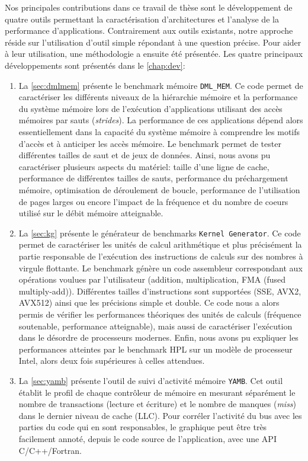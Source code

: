    
    Nos principales contributions dans ce travail de thèse sont le développement de quatre outils permettant la caractérisation d'architectures et l'analyse de la performance d'applications. Contrairement aux outils existants, notre approche réside sur l'utilisation d'outil simple répondant à une question précise. Pour aider à leur utilisation, une méthodologie a ensuite été présentée. Les quatre principaux développements sont présentés dans le \autoref{chap:dev}:
    \begin{enumerate}
        \item La \autoref{sec:dmlmem} présente le benchmark mémoire \verb|DML_MEM|. Ce code permet de caractériser les différents niveaux de la hiérarchie mémoire et la performance du système mémoire lors de l'exécution d'applications utilisant des accès mémoires par sauts (\textit{strides}). La performance de ces applications dépend alors essentiellement dans la capacité du système mémoire à comprendre les motifs d'accès et à anticiper les accès mémoire.
        Le benchmark permet de tester différentes tailles de saut et de jeux de données. Ainsi, nous avons pu caractériser plusieurs aspects du matériel: taille d'une ligne de cache, performance de différentes tailles de sauts, performance du préchargement mémoire, optimisation de déroulement de boucle, performance de l'utilisation de pages larges ou encore l'impact de la fréquence et du nombre de coeurs utilisé sur le débit mémoire atteignable.
        
        \item La \autoref{sec:kg} présente le générateur de benchmarks \verb|Kernel Generator|. Ce code permet de caractériser les unités de calcul arithmétique et plus précisément la partie responsable de l'exécution des instructions de calculs sur des nombres à virgule flottante. Le benchmark génère un code assembleur correspondant aux opérations voulues par l'utilisateur (addition, multiplication, FMA (fused multiply-add)).  Différentes tailles d'instructions sont supportées (SSE, AVX2, AVX512) ainsi que les précisions simple et double. Ce code nous a alors permis de vérifier les performances théoriques des unités de calculs (fréquence soutenable, performance atteignable), mais aussi de caractériser l'exécution dans le désordre de processeurs modernes. Enfin, nous avons pu expliquer les performances atteintes par le benchmark HPL sur un modèle de processeur Intel, alors deux fois supérieures à celles attendues. 
        
        \item La \autoref{sec:yamb} présente l'outil de suivi d'activité mémoire \verb|YAMB|. Cet outil établit le profil de chaque contrôleur de mémoire en mesurant séparément le nombre de transactions (lecture et écriture) et le nombre de manques (\textit{miss}) dans le dernier niveau de cache (LLC). Pour corréler l'activité du bus avec les parties du code qui en sont responsables, le graphique peut être très facilement annoté, depuis le code source de l'application, avec une API C/C++/Fortran.
        

\end{enumerate}
